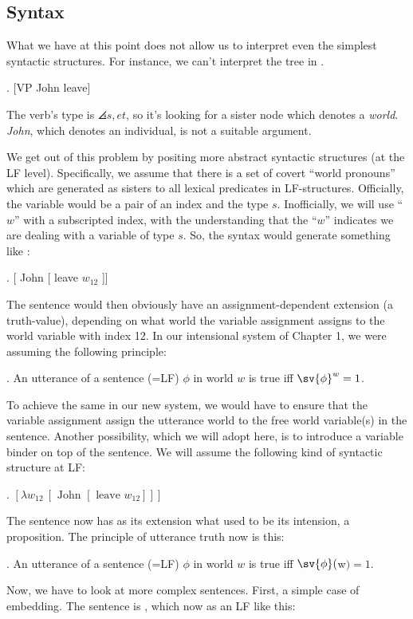 \subsection{Syntax}

What we have at this point does not allow us to interpret even the simplest syntactic structures. For instance, we can't interpret the tree in \Next.

\exi. [VP John leave]

The verb's type is $\angles{s,et}$, so it's looking for a sister node which denotes a \emph{world}. \emph{John}, which denotes an individual, is not a suitable argument.

We get out of this problem by positing more abstract syntactic structures (at the LF level). Specifically, we assume that there is a set of covert ``world pronouns'' which are generated as sisters to all lexical predicates in LF-structures. Officially, the variable would be a pair of an index and the type $s$. Inofficially, we will use ``$w$'' with a subscripted index, with the understanding that the ``$w$'' indicates we are dealing with a variable of type $s$. So, the syntax would generate something like \Next:

\ex. [ John [ leave $w_{12}$ ]]

The sentence would then obviously have an assignment-dependent extension (a truth-value), depending on what world the variable assignment assigns to the world variable with index 12. In our intensional system of Chapter 1, we were assuming the following principle:

\ex. An utterance of a sentence (=LF) $\phi$ in world $w$ is true iff $\sv{\phi}^w = 1$.

To achieve the same in our new system, we would have to ensure that the variable assignment assign the utterance world to the free world variable(s) in the sentence. Another possibility, which we will adopt here, is to introduce a variable binder on top of the sentence. We will assume the following kind of syntactic structure at LF:

\ex. $[ \lambda w_{12}\ [ \mbox{ John } [ \mbox{ leave } w_{12} ]]]$

The sentence now has as its extension what used to be its intension, a proposition. The principle of utterance truth now is this:

\ex. An utterance of a sentence (=LF) $\phi$ in world $w$ is true iff $\sv{\phi}($w$) = 1$.

Now, we have to look at more complex sentences. First, a simple case of embedding. The sentence is , which now as an LF like this:

